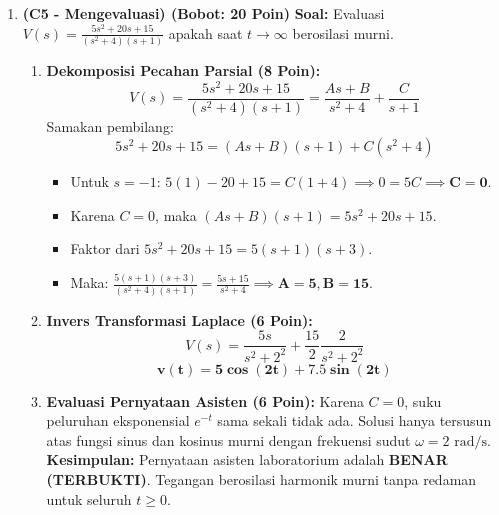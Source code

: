 \documentclass[11pt,a4paper]{article}
\begin{document}
\begin{enumerate}[label=\textbf{Soal \arabic*.}]
    \newpage

    \item \textbf{(C5 - Mengevaluasi) (Bobot: 20 Poin)}
    \textbf{Soal:} Evaluasi $V(s) = \frac{5s^2 + 20s + 15}{(s^2+4)(s+1)}$ apakah saat $t \to \infty$ berosilasi murni.
    \begin{tcolorbox}[colback=green!5!white,colframe=green!60!black,title=Solusi Model:]
    \begin{enumerate}
        \item \textbf{Dekomposisi Pecahan Parsial (8 Poin):}
        $$ V(s) = \frac{5s^2 + 20s + 15}{(s^2+4)(s+1)} = \frac{A s + B}{s^2 + 4} + \frac{C}{s+1} $$
        Samakan pembilang:
        $$ 5s^2 + 20s + 15 = (As + B)(s+1) + C(s^2+4) $$
        \begin{itemize}
            \item Untuk $s = -1$: $5(1) - 20 + 15 = C(1+4) \implies 0 = 5C \implies \mathbf{C = 0}$.
            \item Karena $C = 0$, maka $(As + B)(s+1) = 5s^2 + 20s + 15$.
            \item Faktor dari $5s^2+20s+15 = 5(s+1)(s+3)$.
            \item Maka: $\frac{5(s+1)(s+3)}{(s^2+4)(s+1)} = \frac{5s + 15}{s^2 + 4} \implies \mathbf{A = 5, B = 15}$.
        \end{itemize}
        \item \textbf{Invers Transformasi Laplace (6 Poin):}
        $$ V(s) = \frac{5s}{s^2+2^2} + \frac{15}{2}\frac{2}{s^2+2^2} $$
        $$ \mathbf{v(t) = 5\cos(2t) + 7.5\sin(2t)} $$
        \item \textbf{Evaluasi Pernyataan Asisten (6 Poin):}
        Karena $C=0$, suku peluruhan eksponensial $e^{-t}$ sama sekali tidak ada. Solusi hanya tersusun atas fungsi sinus dan kosinus murni dengan frekuensi sudut $\omega = 2\text{ rad/s}$.
        \textbf{Kesimpulan:} Pernyataan asisten laboratorium adalah \textbf{BENAR (TERBUKTI)}. Tegangan berosilasi harmonik murni tanpa redaman untuk seluruh $t \ge 0$.
    \end{enumerate}
    \end{tcolorbox}


\end{enumerate}
\end{document}
